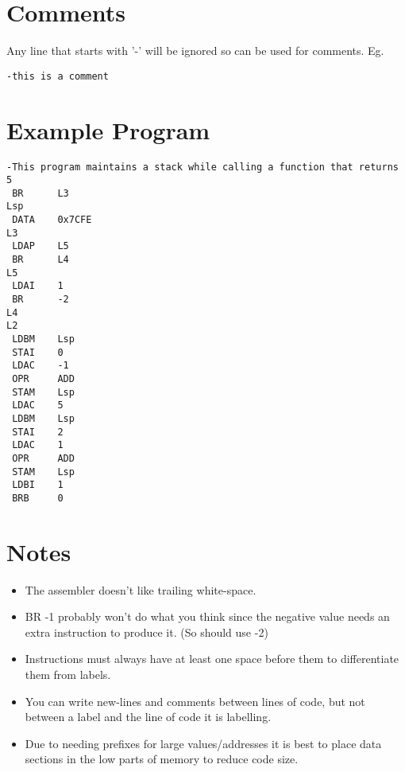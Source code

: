 \documentclass[10pt,a4paper]{article}
\begin{document}
\section{Comments}
Any line that starts with '-' will be ignored so can be used for comments.
\break Eg.
\begin{lstlisting}[frame=single]
-this is a comment
\end{lstlisting}

\section{Example Program}
\begin{lstlisting}[frame=single]
-This program maintains a stack while calling a function that returns 5
 BR      L3
Lsp
 DATA    0x7CFE
L3
 LDAP    L5
 BR      L4
L5
 LDAI    1
 BR      -2
L4
L2
 LDBM    Lsp
 STAI    0
 LDAC    -1
 OPR     ADD
 STAM    Lsp
 LDAC    5
 LDBM    Lsp
 STAI    2
 LDAC    1
 OPR     ADD
 STAM    Lsp
 LDBI    1
 BRB     0
\end{lstlisting}

\section{Notes}

\begin{itemize}
  \item The assembler doesn't like trailing white-space.
  \item BR -1 probably won't do what you think since the negative value needs an extra instruction to produce it. (So should use -2)
  \item Instructions must always have at least one space before them to differentiate them from labels.
  \item You can write new-lines and comments between lines of code, but not between a label and the line of code it is labelling.
  \item Due to needing prefixes for large values/addresses it is best to place data sections in the low parts of memory to reduce code size.
\end{itemize}
\end{document}
